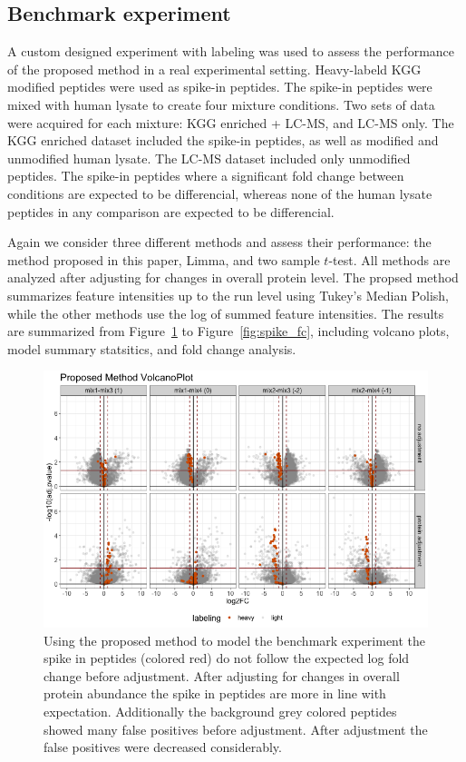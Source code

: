 \documentclass{mcp}
\def\sfigref#1{{Figure~\ref{#1}}}
\begin{document}
\clearpage
\subsection{Benchmark experiment}
\label{sec:benchmark}

A custom designed experiment with labeling was used to assess the performance of the proposed method in a real experimental setting. Heavy-labeld KGG modified peptides were used as spike-in peptides. The spike-in peptides were mixed with human lysate to create four mixture conditions. Two sets of data were acquired for each mixture: KGG enriched + LC-MS, and LC-MS only. The KGG enriched dataset included the spike-in peptides, as well as modified and unmodified human lysate. The LC-MS dataset included only unmodified peptides. The spike-in peptides where a significant fold change between conditions are expected to be differencial, whereas none of the human lysate peptides in any comparison are expected to be differencial. 

Again we consider three different methods and assess their performance: the method proposed in this paper, Limma, and two sample $t$-test. All methods are analyzed after adjusting for changes in overall protein level. The propsed method summarizes feature intensities up to the run level using Tukey's Median Polish, while the other methods use the log of summed feature intensities. The results are summarized from \sfigref{fig:spike_volcano_msstats} to \sfigref{fig:spike_fc}, including volcano plots, model summary statsitics, and fold change analysis.

\begin{figure}[h!]
\centering
\includegraphics[width=.85\textwidth]{sim_new/spike_in_msstatsptm_volcano}
\caption{Using the proposed method to model the benchmark experiment the spike in peptides (colored red) do not follow the expected log fold change before adjustment. After adjusting for changes in overall protein abundance the spike in peptides are more in line with expectation. Additionally the background grey colored peptides showed many false positives before adjustment. After adjustment the false positives were decreased considerably. \label{fig:spike_volcano_msstats}}
\end{figure}
\end{document}
